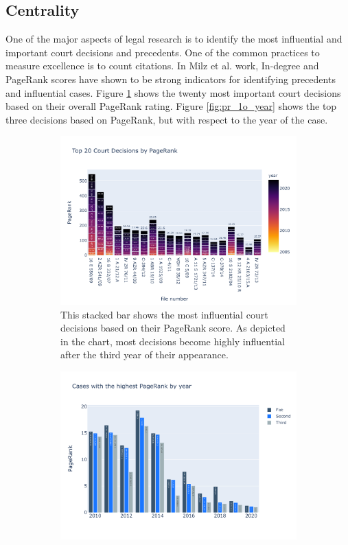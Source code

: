 \documentclass[runningheads]{llncs}
\begin{document}
\subsection{Centrality}

One of the major aspects of legal research is to identify the most influential and important court decisions and precedents. One of the common practices to measure excellence is to count citations. In Milz et al. work, In-degree and PageRank scores have shown to be strong indicators for identifying precedents and influential cases. Figure \ref{fig:top_20_pr} shows the twenty most important court decisions based on their overall PageRank rating. Figure \ref{fig:pr_1o_year} shows the top three decisions based on PageRank, but with respect to the year of the case.

\begin{figure}[!h]
     \centering
     \begin{subfigure}[b]{0.49\textwidth}
         \centering
         \includegraphics[width=\textwidth]{images/top20ByPagerank.pdf}
         \caption{This stacked bar shows the most influential court decisions based on their PageRank score. As depicted in the chart, most decisions become highly influential after the third year of their appearance.}
         \label{fig:top_20_pr}
     \end{subfigure}
     \hfill
     \begin{subfigure}[b]{0.49\textwidth}
         \centering
         \includegraphics[width=\textwidth]{images/PageRankLast10Years.pdf}

\end{subfigure}
\end{figure}
\end{document}
